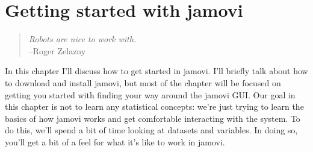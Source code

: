 

\chapter{Getting started with jamovi\label{ch:introj}}

\begin{quote}
{\it Robots are nice to work with.}\\ 
\hspace*{2cm}--Roger Zelazny
\end{quote}


\noindent
In this chapter I'll discuss how to get started in jamovi. I'll briefly talk about how to download and install jamovi, but most of the chapter will be focused on getting you started with finding your way around the jamovi GUI. Our goal in this chapter is not to learn any statistical concepts: we're just trying to learn the basics of how jamovi works and get comfortable interacting with the system. To do this, we'll spend a bit of time looking at datasets and variables. In doing so, you'll get a bit of a feel for what it's like to work in jamovi. 

